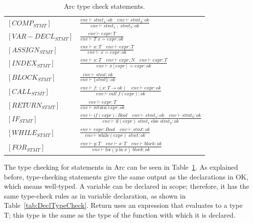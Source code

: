 \begin{table}[htb!]
    \centering
    \begin{tabular}{ll}
        \toprule
        $[COMP_{STMT}] $     & $\frac
            {env \vdash stmt_1 :ok \quad env \vdash stmt_2 :ok}
            {env \vdash stmt_1\;;\;stmt_2: ok}$
        \\ [12pt]
        $[VAR-DECL_{STMT}] $ & $\frac
            {env \vdash expr : T}
            {env \vdash  T \;x = expr: ok}$
        \\ [12pt]
        $[ASSIGN_{STMT}]$    & $\frac
            {env\vdash x: T \quad env \vdash expr : T}
            {env\vdash x = expr: ok}$
        \\ [12pt]
        $[INDEX_{STMT}] $    & $\frac
            {env \vdash x : T \quad env \vdash expr : N \quad env \vdash expr : T}
            {env \vdash x[expr] = expr: ok}$
        \\ [12pt]
        $[BLOCK_{STMT}] $    & $\frac
            {env \vdash stmt :ok}
            {env \vdash \{stmt\}: ok}$
        \\ [12pt]
        $[CALL_{STMT}] $     & $\frac
            {env \vdash f:(x:T \rightarrow ok)\quad env \vdash expr:ok}
            {env \vdash call \;f(expr): ok}$
        \\ [12pt]
        $[RETURN_{STMT}] $   & $\frac
            {env \vdash expr: T}
            {env \vdash \text{return} \;expr: ok}$
        \\ [12pt]
        $[IF_{STMT}] $       & $\frac
            {env \vdash if (expr) : Bool \quad env \vdash stmt_1 :ok \quad env \vdash stmt_2 :ok}
            {env \vdash \text{if} (expr) \;stmt_1 \;\text{else} \;stmt_2: ok}$
        \\ [12pt]
        $[WHILE_{STMT}] $    & $\frac
            {env \vdash  expr : Bool \quad env \vdash stmt :ok}
            {env \vdash \text{while} (expr) \;stmt : ok}$
        \\ [12pt]
        $[FOR_{STMT}] $      & $\frac
            {env \vdash  y : T \quad env \vdash x : T \quad env \vdash block :ok}
            {env \vdash \text{for} (y \; \text{in} \; x) \; block : ok}$
        \\
        \bottomrule
    \end{tabular}
    \caption{Arc type check statements.}
    \label{tab:StatementTypeCheck}
\end{table}


The type checking for statements in Arc can be seen in Table~\ref{tab:StatementTypeCheck}. As explained before, type-checking statements give the same output as the declarations in OK, which means well-typed. A variable can be declared in scope; therefore, it has the same type-check rules as in variable declaration, as shown in Table~\ref{tab:DeclTypeCheck}. Return uses an expression that evaluates to a type T; this type is the same as the type of the function with which it is declared.